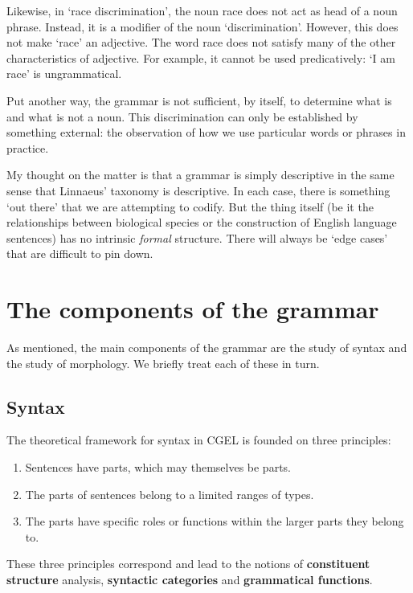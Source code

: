 \documentclass{scrarticle}
\begin{document}
Likewise, in ‘race discrimination’, the noun race does not act as head of a noun phrase. Instead, it
is a modifier of the noun ‘discrimination’. However, this does not make ‘race’ an adjective. The
word race does not satisfy many of the other characteristics of adjective. For example, it cannot be
used predicatively: ‘I am race’ is ungrammatical.

Put another way, the grammar is not sufficient, by itself, to determine what is and what is not a
noun. This discrimination can only be established by something external: the observation of how we
use particular words or phrases in practice.

My thought on the matter is that a grammar is simply descriptive in the same sense that Linnaeus’
taxonomy is descriptive. In each case, there is something ‘out there’ that we are attempting to
codify. But the thing itself (be it the relationships between biological species or the construction
of English language sentences) has no intrinsic \emph{formal} structure. There will always be ‘edge
cases’ that are difficult to pin down.


\section{The components of the grammar}

As mentioned, the main components of the grammar are the study of syntax and the study of
morphology. We briefly treat each of these in turn.

\subsection{Syntax}

The theoretical framework for syntax in CGEL is founded on three principles:

\begin{enumerate}
    \item Sentences have parts, which may themselves be parts.
    \item The parts of sentences belong to a limited ranges of types.
    \item The parts have specific roles or functions within the larger parts they belong to.
\end{enumerate}

These three principles correspond and lead to the notions of \textbf{constituent structure} analysis,
\textbf{syntactic categories} and \textbf{grammatical functions}.
\end{document}
